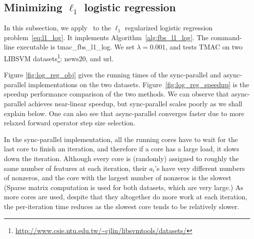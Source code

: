\subsection{Minimizing $\ell_1$ logistic regression}
In this subsection, we apply \pkg~to the $\ell_1$ regularized logistic regression problem~\eqref{eq:l1_log}. It implements Algorithm~\ref{alg:fbs_l1_log}. The command-line executable is tmac\_fbs\_l1\_log. We set $\lambda =0.001$, and tests TMAC on two LIBSVM datasets\footnote{\url{http://www.csie.ntu.edu.tw/~cjlin/libsvmtools/datasets/}}: news20, and url.

Figure \ref{fig:log_reg_obj} gives the running times of  the sync-parallel and async-parallel implementations on the two datasets. Figure~\ref{fig:log_reg_speedup} is the speedup performance comparison of the two methods. We can observe that async-parallel achieves near-linear speedup, but sync-parallel scales poorly as we shall explain below. One can also see that async-parallel converges faster due to more relaxed forward operator step size selection.

In the sync-parallel implementation,  all the running cores have to wait for the last core to finish an iteration, and therefore if a core has a large load, it slows down the iteration. Although every core is (randomly) assigned to roughly the same number of features at each iteration, their  $a_i$'s have very different numbers of nonzeros, and the core with the largest number of nonzeros is the slowest (Sparse matrix computation is used for both datasets, which are very large.) As more cores are used,  despite that they altogether do more work at each iteration, the per-iteration time reduces as the slowest core tends to be relatively slower.


